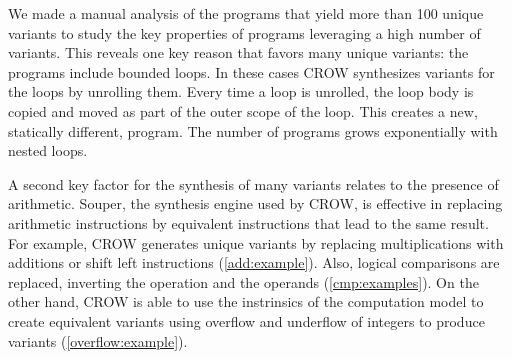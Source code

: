 We made a manual analysis of the programs that yield more than 100 unique variants to study the key properties of programs leveraging a high number of variants.
This reveals one key reason that favors many unique variants: the programs include  bounded loops. In these cases CROW
synthesizes variants for the loops by unrolling them. Every time a loop is unrolled, the loop body is copied and moved as part of the outer scope of the loop. This creates a new, statically different, program. The number of programs grows exponentially with nested loops. 

A second key factor for the synthesis of many variants relates to the presence of arithmetic. Souper, the synthesis engine used by CROW, is effective in replacing  arithmetic instructions by equivalent instructions that lead to the same result. For example, CROW generates unique variants by replacing multiplications with additions or shift left instructions (\autoref{add:example}). Also, logical comparisons are replaced, inverting the operation and the operands (\autoref{cmp:examples}). On the other hand, CROW is able to use the instrinsics of the computation model to create equivalent variants using overflow and underflow of integers to produce variants (\autoref{overflow:example}).


